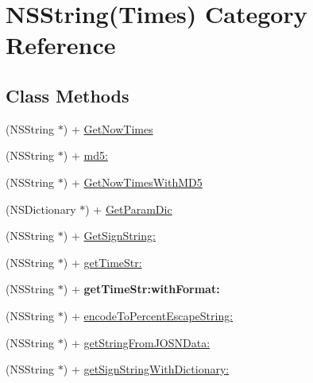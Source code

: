 \hypertarget{category_n_s_string_07_times_08}{}\section{N\+S\+String(Times) Category Reference}
\label{category_n_s_string_07_times_08}
\subsection*{Class Methods}
\begin{DoxyCompactItemize}
\item 
(N\+S\+String $\ast$) + \mbox{\hyperlink{category_n_s_string_07_times_08_a05f6ee23ca20fcc47f3187622a9e8bea}{Get\+Now\+Times}}
\item 
(N\+S\+String $\ast$) + \mbox{\hyperlink{category_n_s_string_07_times_08_a22934297252e64c305389e97eb4319d7}{md5\+:}}
\item 
(N\+S\+String $\ast$) + \mbox{\hyperlink{category_n_s_string_07_times_08_af69e52b5d40aaf603db99ea7f4c73796}{Get\+Now\+Times\+With\+M\+D5}}
\item 
(N\+S\+Dictionary $\ast$) + \mbox{\hyperlink{category_n_s_string_07_times_08_af4f38d756064442106df6f07a56299a1}{Get\+Param\+Dic}}
\item 
(N\+S\+String $\ast$) + \mbox{\hyperlink{category_n_s_string_07_times_08_a35836167ec3473632c110e7bcb7b5743}{Get\+Sign\+String\+:}}
\item 
(N\+S\+String $\ast$) + \mbox{\hyperlink{category_n_s_string_07_times_08_ae4bb7371e75f904b8c57f8bb3d3e513b}{get\+Time\+Str\+:}}
\item 
\mbox{\label{category_n_s_string_07_times_08_a661d99c062c9f97c44d40daadb303690}} 
(N\+S\+String $\ast$) + {\bfseries get\+Time\+Str\+:with\+Format\+:}
\item 
(N\+S\+String $\ast$) + \mbox{\hyperlink{category_n_s_string_07_times_08_af55afa2034ba8702514b1d68c7c4f8db}{encode\+To\+Percent\+Escape\+String\+:}}
\item 
(N\+S\+String $\ast$) + \mbox{\hyperlink{category_n_s_string_07_times_08_a3464891b4cc17283a4a9b33009a1a7f4}{get\+String\+From\+J\+O\+S\+N\+Data\+:}}
\item 
(N\+S\+String $\ast$) + \mbox{\hyperlink{category_n_s_string_07_times_08_a20970fac477cb12307ea48839d43cac2}{get\+Sign\+String\+With\+Dictionary\+:}}
\item 
\mbox{\label{category_n_s_string_07_times_08_a06cd1740ad15ec81bb3117492a3a877e}} 

\end{DoxyCompactItemize}
